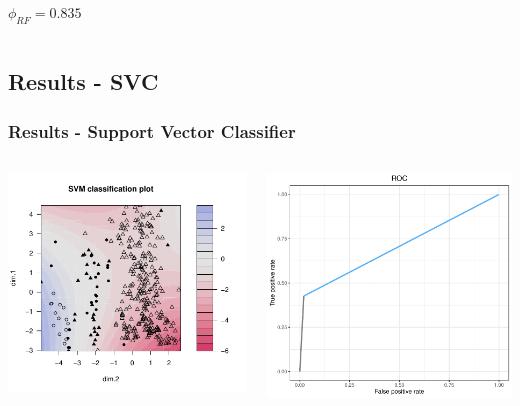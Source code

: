 \documentclass[compress]{beamer}
\begin{document}
\begin{frame}
\begin{columns}
\begin{center}
$\phi_{RF}=0.835$
\end{center}
\end{columns}
\end{frame}

\subsection{Results - SVC}
\begin{frame}
\frametitle{Results - Support Vector Classifier}
\begin{columns}
\begin{center}
\includegraphics[width=\linewidth]{Pic/PCA+SVM_PLOT.pdf}
\end{center}
\begin{center}
\includegraphics[width=0.5\linewidth]{Pic/SVM_FINAL_ROC.pdf}

\end{center}
\end{columns}
\end{frame}
\end{document}

